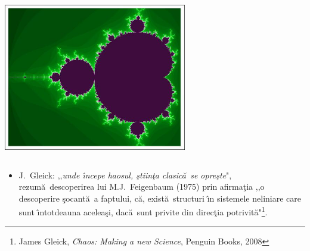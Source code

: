 \documentclass[a4,compress,handout]{beamer}
\newcommand{\ab}{\u{a}}
\newcommand{\ib}{\^{\i}}
\newcommand{\tb}{\c{t}}
\newcommand{\st}{\c{s}}
\begin{document}
\begin{frame}
\begin{columns}[c]
\begin{column}{0.3\textwidth}
			
			\hfill\includegraphics[width=0.6\textwidth]{mandelbrot}\hspace*{\fill}
		
		\end{column}
	\end{columns}
	\vspace{0.2cm}
	
	\begin{itemize}
		\item {\small J.\ Gleick: {\color{darkblue},,\textit{unde \ib ncepe haosul, \st tiin\tb a clasic\ab\ se opre\st te}"}, rezum\ab\ descoperirea lui M.J.\ Feigenbaum (1975) prin afirma\tb ia  {\color{darkblue},,o descoperire \st ocant\ab\ a faptului, c\ab , exist\ab\ structuri \ib n sistemele neliniare care sunt \ib ntotdeauna acelea\st i, dac\ab\ sunt privite din direc\tb ia potrivit\ab"}}\footnote{James Gleick, {\it Chaos: Making a new Science}, Penguin Books,  2008}.
	\end{itemize}
	
\end{frame}



\end{document}
